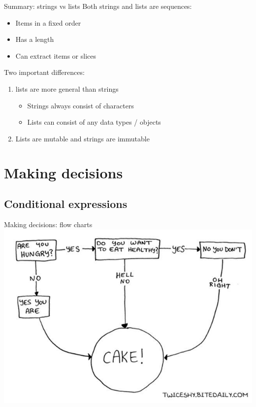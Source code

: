 \documentclass[aspectratio=169,usenames,dvipsnames]{beamer}
\begin{document}
\begin{frame}[fragile]{Summary: strings vs lists}
Both strings and lists are sequences:
    \begin{itemize}
        \item Items in a fixed order
        \item Has a length
        \item Can extract items or slices
    \end{itemize}

Two important differences:
\begin{enumerate}
    \item lists are more general than strings
        \begin{itemize}
            \item Strings always consist of characters
            \item Lists can consist of any data types / objects
        \end{itemize}
    \item Lists are mutable and strings are immutable
\end{enumerate}

\end{frame}







\section{Making decisions}
\subsection{Conditional expressions}
\frame{\tableofcontents[currentsubsection]}

\begin{frame}{Making decisions: flow charts}
    \includegraphics[height=0.8\textheight]{fig/flowchart}
\end{frame}
\end{document}
